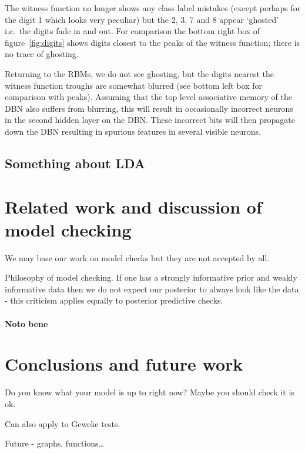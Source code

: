 \documentclass{article} %
\def\ie{i.e.\ }
\begin{document}
The witness function no longer shows any class label mistakes (except perhaps for the digit 1 which looks very peculiar) but the 2, 3, 7 and 8 appear `ghosted' \ie the digits fade in and out.
For comparison the bottom right box of figure~\ref{fig:digits} shows digits closest to the peaks of the witness function; there is no trace of ghosting.

Returning to the RBMs, we do not see ghosting, but the digits nearest the witness function troughs are somewhat blurred (see bottom left box for comparison with peaks).
Assuming that the top level associative memory of the DBN also suffers from blurring, this will result in occasionally incorrect neurons in the second hidden layer on the DBN.
These incorrect bits will then propagate down the DBN resulting in spurious features in several visible neurons.


\subsection{Something about LDA}


\section{Related work and discussion of model checking}

We may base our work on model checks but they are not accepted by all.

Philosophy of model checking.
If one has a strongly informative prior and weakly informative data then we do not expect our posterior to always look like the data - this criticism applies equally to posterior predictive checks.

\paragraph{Noto bene}


\section{Conclusions and future work}

Do you know what your model is up to right now?
Maybe you should check it is ok.

Can also apply to Geweke tests.

Future - graphs, functions\ldots



\end{document}
